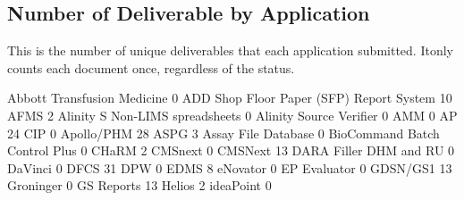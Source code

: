 \documentclass{article}
\begin{document}
\subsection{Number of Deliverable by Application}
This is the number of unique deliverables that each application submitted. Itonly counts
each document once, regardless of the status.
\begin{Schunk}
\begin{Soutput}
             Abbott Transfusion Medicine 
                                       0 
ADD Shop Floor Paper (SFP) Report System 
                                      10 
                                    AFMS 
                                       2 
         Alinity S Non-LIMS spreadsheets 
                                       0 
                 Alinity Source Verifier 
                                       0 
                                     AMM 
                                       0 
                               AP 24 CIP 
                                       0 
                              Apollo/PHM 
                                      28 
                                    ASPG 
                                       3 
                     Assay File Database 
                                       0 
           BioCommand Batch Control Plus 
                                       0 
                                   CHaRM 
                                       2 
                                 CMSnext 
                                       0 
                                 CMSNext 
                                      13 
                  DARA Filler DHM and RU 
                                       0 
                                 DaVinci 
                                       0 
                                    DFCS 
                                      31 
                                     DPW 
                                       0 
                                    EDMS 
                                       8 
                                eNovator 
                                       0 
                            EP Evaluator 
                                       0 
                                GDSN/GS1 
                                      13 
                               Groninger 
                                       0 
                              GS Reports 
                                      13 
                                  Helios 
                                       2 
                               ideaPoint 
                                       0 

\end{Soutput}
\end{Schunk}
\end{document}
